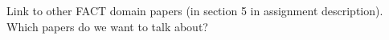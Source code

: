Link to other FACT domain papers (in section 5 in assignment description). Which papers do we want to talk about?